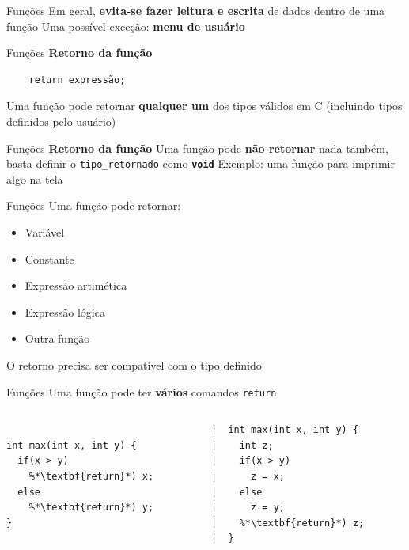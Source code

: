 \documentclass[10pt]{beamer}
\begin{document}
\begin{frame}{Funções}
  \huge
  Em geral, \textbf{evita-se fazer leitura e escrita} de dados dentro de uma função
  \vfill
  Uma possível exceção: \textbf{menu de usuário}
\end{frame}

\begin{frame}[fragile]{Funções}
  \huge
  \textbf{Retorno da função}
  \vfill
  \Large
  \begin{verbatim}
    return expressão;
      \end{verbatim}
  \vfill
  \large
  Uma função pode retornar \textbf{qualquer um} dos tipos válidos em C (incluindo tipos definidos pelo usuário)
\end{frame}

\begin{frame}{Funções}
  \huge
  \textbf{Retorno da função}
  \vfill
  \Large
  Uma função pode \textbf{não retornar} nada também, basta definir o \texttt{tipo\_retornado} como \textbf{\texttt{void}}
  \vfill
  \large
  Exemplo: uma função para imprimir algo na tela
\end{frame}

\begin{frame}{Funções}
  \huge
  Uma função pode retornar:
  \vfill
  \Large
  \begin{itemize}
    \item Variável
    \item Constante
    \item Expressão artimética
    \item Expressão lógica
    \item Outra função
  \end{itemize}
  \vfill
  \large
  O retorno precisa ser compatível com o tipo definido
\end{frame}

\begin{frame}[fragile]{Funções}
  \huge
  Uma função pode ter \textbf{vários} comandos \texttt{return}
  \vfill
  \normalsize
  \begin{columns}
    \begin{column}{0.40\textwidth}
      \begin{lstlisting}

int max(int x, int y) {
  if(x > y)
    %*\textbf{return}*) x;
  else
    %*\textbf{return}*) y;
}

      \end{lstlisting}
    \end{column}
    \begin{column}{0.50\textwidth}
      \begin{lstlisting}
|  int max(int x, int y) {
|    int z;
|    if(x > y)
|      z = x;
|    else
|      z = y;
|    %*\textbf{return}*) z;
|  }
      \end{lstlisting}
    \end{column}
  \end{columns}
\end{frame}
\end{document}
